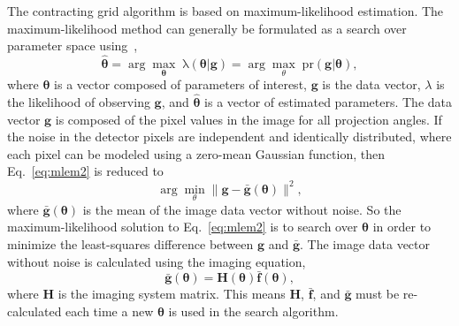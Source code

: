 The contracting grid algorithm is based on maximum-likelihood estimation.  The maximum-likelihood method can generally be formulated as a search over parameter space using~\citep{Barrett2004},
%
\begin{equation}
\label{eq:mlem2}
\mathrm{\boldsymbol{\hat{\theta}}} = \arg\max_{\mathbf{\theta}} \; \mathrm{\lambda (\boldsymbol{\theta} | \mathbf{g})} = \arg\max_{\theta} \; \mathrm{pr( \mathbf{g}|\boldsymbol{\theta})},
\end{equation}
%
where $\boldsymbol{\theta}$ is a vector composed of parameters of interest, $\mathbf{g}$ is the data vector, $\lambda$ is the likelihood of observing $\mathbf{g}$, and $\boldsymbol{\hat{\theta}}$ is a vector of estimated parameters.  The data vector $\mathrm{\mathbf{g}}$ is composed of the pixel values in the image for all projection angles.  If the noise in the detector pixels are independent and identically distributed, where each pixel can be modeled using a zero-mean Gaussian function, then Eq.~\ref{eq:mlem2} is reduced to
%
\begin{equation}
\arg\min_{\theta} \| \mathbf{g} - \mathbf{\bar{g}}(\boldsymbol{\theta}) \|^2,
\label{eq:least_square}
\end{equation}
%
where $\mathbf{\bar{g}}(\boldsymbol{\theta})$ is the mean of the image data vector without noise.  So the maximum-likelihood solution to Eq.~\ref{eq:mlem2} is to search over $\boldsymbol{\theta}$ in order to minimize the least-squares difference between $\mathrm{\mathbf{g}}$ and $\mathrm{\mathbf{\bar{g}}}$.  The image data vector without noise is calculated using the imaging equation,
%
\begin{equation}
\mathrm{\mathbf{ \bar{g}(\boldsymbol{\theta} ) } } = \mathrm{\mathbf{H}( \boldsymbol{\theta} )} \mathrm{\mathbf{\bar{f}} \boldsymbol{(\theta) }},
\end{equation}
%
where $\mathrm{\mathbf{H}}$ is the imaging system matrix.  This means $\mathrm{\mathbf{H}}$, $\mathrm{\mathbf{\bar{f}}}$, and $\mathrm{\mathbf{\bar{g}}}$ must be re-calculated each time a new $\boldsymbol{\theta}$ is used in the search algorithm.  

